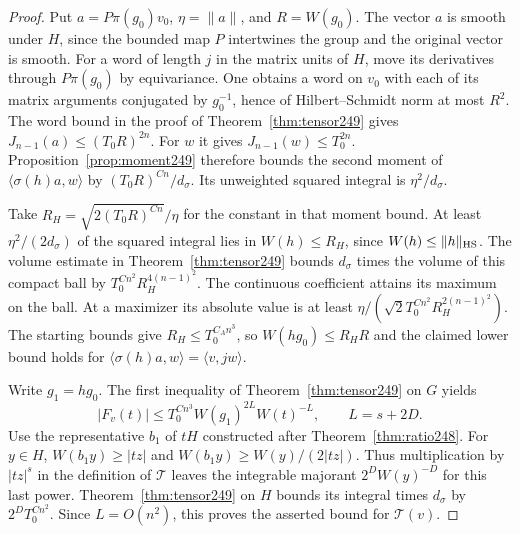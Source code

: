 \documentclass[a4paper,11pt]{article}
\theoremstyle{definition}
\theoremstyle{remark}
\numberwithin{equation}{section}
\begin{document}
\begin{proof}
Put \(a=P\pi(g_0)v_0\), \(\eta=\|a\|\), and \(R=W(g_0)\). The
vector \(a\) is smooth under \(H\), since the bounded map \(P\)
intertwines the group and the original vector is smooth. For a word
of length \(j\) in the matrix units of \(H\), move its derivatives
through \(P\pi(g_0)\) by equivariance. One obtains a word on \(v_0\)
with each of its matrix arguments conjugated by \(g_0^{-1}\), hence
of Hilbert--Schmidt norm at most \(R^2\). The word bound in the proof
of Theorem~\ref{thm:tensor249} gives \(J_{n-1}(a)\le(T_0R)^{2n}\).
For \(w\) it gives \(J_{n-1}(w)\le T_0^{2n}\). Proposition~\ref{prop:moment249}
therefore bounds the second moment of \(\langle\sigma(h)a,w\rangle\)
by \((T_0R)^{C n}/d_\sigma\). Its unweighted squared integral is
\(\eta^2/d_\sigma\).

Take \(R_H=\sqrt{2(T_0R)^{C n}}/\eta\) for the constant in that
moment bound. At least \(\eta^2/(2d_\sigma)\) of the squared integral
lies in \(W(h)\le R_H\), since \(W(h)\le\|h\|_{\rm HS}\). The volume
estimate in Theorem~\ref{thm:tensor249} bounds \(d_\sigma\) times the
volume of this compact ball by \(T_0^{C n^2}R_H^{4(n-1)^2}\).
The continuous coefficient attains its maximum on the ball. At a
maximizer its absolute value is at least
\(\eta/(\sqrt{2}T_0^{C n^2}R_H^{2(n-1)^2})\). The starting bounds give
\(R_H\le T_0^{C_A n^3}\), so \(W(hg_0)\le R_H R\) and the claimed
lower bound holds for \(\langle\sigma(h)a,w\rangle=\langle v,jw\rangle\).

Write \(g_1=hg_0\). The first inequality of Theorem~\ref{thm:tensor249}
on \(G\) yields
\[
 |F_v(t)|\le T_0^{C n^3} W(g_1)^{2L}W(t)^{-L},\qquad L=s+2D .
\]
Use the representative \(b_1\) of \(tH\) constructed after
Theorem~\ref{thm:ratio248}. For \(y\in H\), \(W(b_1y)\ge|tz|\) and
\(W(b_1 y)\ge W(y)/(2|tz|)\). Thus multiplication by \(|tz|^s\) in
the definition of \(\mathcal T\) leaves the integrable majorant
\(2^D W(y)^{-D}\) for this last power. Theorem~\ref{thm:tensor249} on
\(H\) bounds its integral times \(d_\sigma\) by \(2^D T_0^{C n^2}\).
Since \(L=O(n^2)\), this proves the asserted bound for \(\mathcal T(v)\).


\end{proof}
\end{document}
